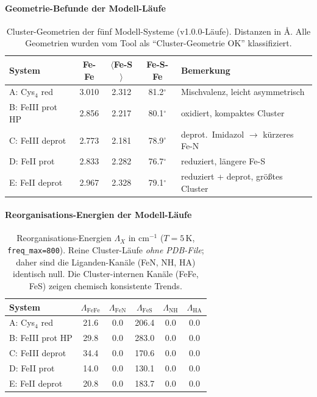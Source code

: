 \documentclass[11pt,a4paper,twoside]{article}
\providecommand{\angstrom}{\text{\AA}}    %
\theoremstyle{remark}
\begin{document}
\paragraph{Geometrie-Befunde der Modell-L\"aufe}

\begin{table}[h]
\centering
\small
\begin{tabular}{|l|c|c|c|l|}
\hline
\textbf{System} & \textbf{Fe-Fe} & \textbf{$\langle$Fe-S$\rangle$} &
  \textbf{Fe-S-Fe} & \textbf{Bemerkung} \\
\hline
A: Cys$_4$ red    & 3.010 & 2.312 & 81.2$^{\circ}$ & Mischvalenz, leicht asymmetrisch \\
B: FeIII prot HP  & 2.856 & 2.217 & 80.1$^{\circ}$ & oxidiert, kompaktes Cluster \\
C: FeIII deprot   & 2.773 & 2.181 & 78.9$^{\circ}$ & deprot.\ Imidazol $\to$ k\"urzeres Fe-N \\
D: FeII prot      & 2.833 & 2.282 & 76.7$^{\circ}$ & reduziert, l\"angere Fe-S \\
E: FeII deprot    & 2.967 & 2.328 & 79.1$^{\circ}$ & reduziert + deprot, gr\"o{\ss}tes Cluster \\
\hline
\end{tabular}
\caption{Cluster-Geometrien der f\"unf Modell-Systeme (v1.0.0-L\"aufe).
Distanzen in $\angstrom$. Alle Geometrien wurden vom Tool als
"`Cluster-Geometrie OK"' klassifiziert.}
\label{tab:val-geometrie}
\end{table}

\paragraph{Reorganisations-Energien der Modell-L\"aufe}

\begin{table}[h]
\centering
\small
\begin{tabular}{|l|c|c|c|c|c|}
\hline
\textbf{System} & $\Lambda_\text{FeFe}$ & $\Lambda_\text{FeN}$ &
  $\Lambda_\text{FeS}$ & $\Lambda_\text{NH}$ & $\Lambda_\text{HA}$ \\
\hline
A: Cys$_4$ red       & 21.6 & 0.0 & 206.4 & 0.0 & 0.0 \\
B: FeIII prot HP   & 29.8 & 0.0 & 283.0 & 0.0 & 0.0 \\
C: FeIII deprot      & 34.4 & 0.0 & 170.6 & 0.0 & 0.0 \\
D: FeII prot         & 14.0 & 0.0 & 130.1 & 0.0 & 0.0 \\
E: FeII deprot       & 20.8 & 0.0 & 183.7 & 0.0 & 0.0 \\
\hline
\end{tabular}
\caption{Reorganisations-Energien $\Lambda_X$ in cm$^{-1}$
($T=5$\,K, \texttt{freq\_max=800}). Reine Cluster-L\"aufe
\emph{ohne PDB-File}; daher sind die Liganden-Kan\"ale (FeN, NH, HA)
identisch null. Die Cluster-internen Kan\"ale (FeFe, FeS) zeigen
chemisch konsistente Trends.}
\label{tab:val-reorg-modell}
\end{table}
\end{document}
